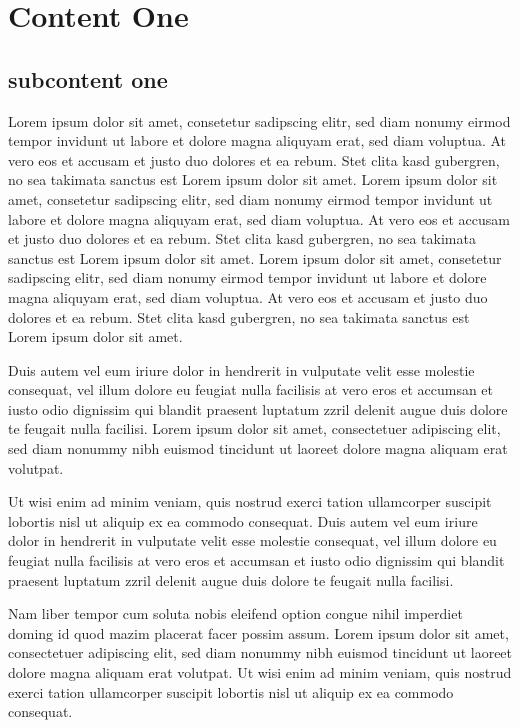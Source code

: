 
\clearpage
\section{Content One}
\subsection{subcontent one}   
 Lorem ipsum dolor sit amet, consetetur sadipscing elitr, sed diam nonumy eirmod
 tempor invidunt ut labore et dolore magna aliquyam erat, sed diam voluptua. At
 vero eos et accusam et justo duo dolores et ea rebum. Stet clita kasd
 gubergren, no sea takimata sanctus est Lorem ipsum dolor sit amet. Lorem ipsum
 dolor sit amet, consetetur sadipscing elitr, sed diam nonumy eirmod tempor
 invidunt ut labore et dolore magna aliquyam erat, sed diam voluptua. At vero
 eos et accusam et justo duo dolores et ea rebum. Stet clita kasd gubergren, no
 sea takimata sanctus est Lorem ipsum dolor sit amet. Lorem ipsum dolor sit
 amet, consetetur sadipscing elitr, sed diam nonumy eirmod tempor invidunt ut
 labore et dolore magna aliquyam erat, sed diam voluptua. At vero eos et accusam
 et justo duo dolores et ea rebum. Stet clita kasd gubergren, no sea takimata
 sanctus est Lorem ipsum dolor sit amet.

Duis autem vel eum iriure dolor in hendrerit in vulputate velit esse molestie
consequat, vel illum dolore eu feugiat nulla facilisis at vero eros et accumsan
et iusto odio dignissim qui blandit praesent luptatum zzril delenit augue duis
dolore te feugait nulla facilisi. Lorem ipsum dolor sit amet, consectetuer
adipiscing elit, sed diam nonummy nibh euismod tincidunt ut laoreet dolore magna
aliquam erat volutpat.

Ut wisi enim ad minim veniam, quis nostrud exerci tation ullamcorper suscipit
lobortis nisl ut aliquip ex ea commodo consequat. Duis autem vel eum iriure
dolor in hendrerit in vulputate velit esse molestie consequat, vel illum dolore
eu feugiat nulla facilisis at vero eros et accumsan et iusto odio dignissim qui
blandit praesent luptatum zzril delenit augue duis dolore te feugait nulla
facilisi.

Nam liber tempor cum soluta nobis eleifend option congue nihil imperdiet doming
id quod mazim placerat facer possim assum. Lorem ipsum dolor sit amet,
consectetuer adipiscing elit, sed diam nonummy nibh euismod tincidunt ut laoreet
dolore magna aliquam erat volutpat. Ut wisi enim ad minim veniam, quis nostrud
exerci tation ullamcorper suscipit lobortis nisl ut aliquip ex ea commodo
consequat.

